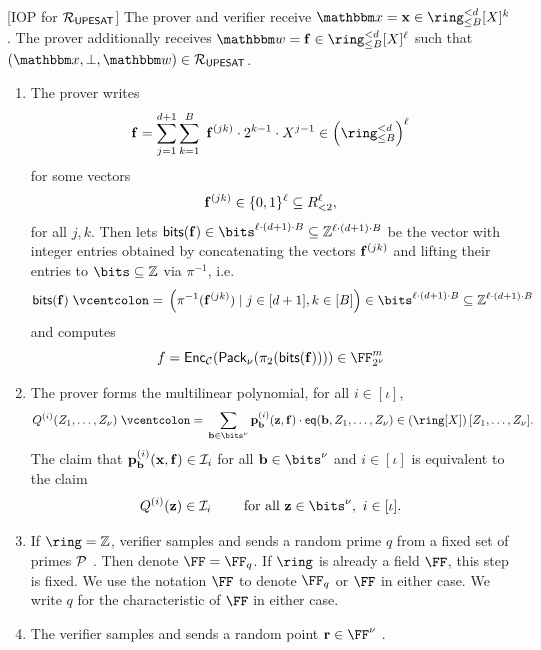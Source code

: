 \documentclass[11pt,letterpaper,usenames,dvipsnames]{article}
\begin{document}
\begin{construction}\label{c:iop_pimsat}
[IOP for {$\mathcal{R}_{\mathsf{UPESAT}}$}]
The prover and verifier receive $\inp=\xx\in \ringtwobounds{B}{\moduledegree}[X]^{\inplen}$. The prover additionally receives $\wit= \bff\in \ringtwobounds{B}{\moduledegree}[X]^\codedim$ such that $(\inp,\bot, \wit) \in \PIMSAT$. 


\newcommand{\iopmlechallenge}{S}
\begin{enumerate}[leftmargin=*] 
\item The prover writes $$\bff= \sum_{j=1}^{d+1} \sum_{k=1}^{B}\  \bff^{(jk)}\cdot 2^{k-1}\cdot  X^{j-1} \in \left(\ringtwobounds{B}{\moduledegree}\right)^{\codedim}$$ for some vectors $$\mathbf{f}^{(jk)}\in \{0,1\}^{\ell}\subseteq R_{<2}^\ell,$$ for all $j,k$. Then  lets $\mathsf{bits}(\bff)\in \bits^{\codedim\cdot (\moduledegree+1)\cdot B} \subseteq \ZZ^{\codedim\cdot (\moduledegree+1)\cdot B}$ be the vector with integer entries obtained by concatenating the vectors $\mathbf{f}^{(jk)}$ and lifting their entries to $\bits \subseteq \ZZ$ via $\pi^{-1}$, i.e.\ $$\mathsf{bits}(\bff) \defeq \left(\pi^{-1}(\bff^{(jk)})\mid j\in [\moduledegree+1], k\in [B]\right)\in \bits^{\codedim\cdot (\moduledegree+1)\cdot B} \subseteq \ZZ^{\codedim\cdot (\moduledegree+1)\cdot B}$$ and computes $$f= \Enc_{\cC}(\pack(\pi_2(\mathsf{bits}(\bff)))) \in \comfield^{\codelength}$$
\item The prover forms the multilinear polynomial, for all $i\in [\iota]$,
%
$$
Q^{(i)}(Z_1, \ldots, Z_\nu) \defeq \sum_{\bb\in \bits^\nu}\pp_{\bb}^{(i)}(\zz,\bff) \cdot \eq(\bb, Z_1, \ldots, Z_\nu) \in \left(\ring[X]\right)[Z_1, \ldots, Z_\nu].
$$
%
The  claim that  $\mathbf{p}_{\mathbf{b}}^{(i)}(\mathbf{x}, \mathbf{f}) \in \mathcal{I}_i$  for all  $\bb\in \bits^\nu$ and $i \in [\iota]$ is equivalent to the claim 
%
$$
   Q^{(i)}(\zz) \in \ideal_i \qquad  \text{ for all } \zz\in \bits^\nu, \ i \in [\iota].
$$
%
\item If $\ring=\ZZ$, verifier samples and sends a random prime $q$ from a fixed set of primes $\mathcal{P}$ .  Then denote $\FF=\FF_q$. If $\ring$ is already a field $\FF$, this step is fixed. We use the notation $\FF$ to denote $\FF_q$ or $\FF$ in either case. We write $q$ for the characteristic of $\FF$ in either case. 
\item The verifier samples and sends a random point $\rr\in \FF^{\nu}$ .

\end{enumerate}
\end{construction}
\end{document}
